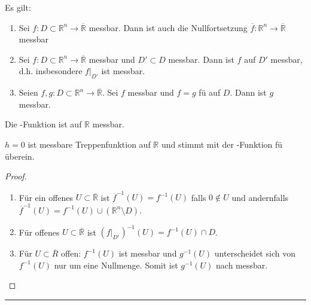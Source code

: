 \begin{proposition}
	Es gilt:\begin{enumerate}[label={\alph*)}]
		\item Sei $f:D\subset\mathbb{R}^n\to\overline{\mathbb{R}}$ messbar. Dann ist auch die Nullfortsetzung $\overline{f}:\mathbb{R}^n\to\overline{\mathbb{R}}$ messbar
		\item Sei $f:D\subset\mathbb{R}^n\to\overline{\mathbb{R}}$ messbar und $D'\subset D$ messbar. Dann ist $f$ auf $D'$ messbar, d.h. insbesondere $\left. f\right|_{D'}$ ist messbar.
		\item Seien $f,g:D\subset\mathbb{R}^n\to\overline{\mathbb{R}}$. Sei $f$ messbar und $f=g$ \gls{fü} auf $D$. Dann ist $g$ messbar.
	\end{enumerate}
\end{proposition}

\begin{example}
	Die -Funktion ist auf $\mathbb{R}$ messbar.
	
	$h=0$ ist messbare Treppenfunktion auf $\mathbb{R}$ und stimmt mit der -Funktion \gls{fü} überein.
\end{example}

\begin{proof}\hspace*{0pt}
	\begin{enumerate}[label={(\alph*)},topsep=\dimexpr -\baselineskip / 2\relax]
		\item Für ein offenes $U\subset\overline{\mathbb{R}}$ ist $\overline{f}^{-1}(U) = f^{-1}(U)$ falls $0\notin U$ und andernfalls $\overline{f}^{-1}(U) = f^{-1}(U)\cup (\mathbb{R}^n\setminus D)$.
		\item Für offenes $U\subset\overline{\mathbb{R}}$ ist $\left(\left. f\right|_{D'}\right)^{-1} (U) = f^{-1} (U)\cap D$.
		\item Für $U\subset\overline{R}$ offen: $f^{-1}(U)$ ist messbar und $g^{-1}(U)$ unterscheidet sich von $f^{-1}(U)$ nur um eine Nullmenge. Somit ist $g^{-1}(U)$ nach  messbar.
	\end{enumerate}
\end{proof}

\rule{0.4\linewidth}{0.1pt}

